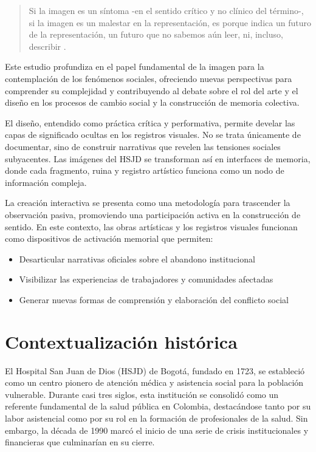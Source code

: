\begin{quote}
Si la imagen es un síntoma -en el sentido crítico y no clínico del término-, si la imagen es un malestar en la representación, es porque indica un futuro de la representación, un futuro que no sabemos aún leer, ni, incluso, describir \parencite[p. 177]{DidiHuberman2011}.
\end{quote}

Este estudio profundiza en el papel fundamental de la imagen para la contemplación de los fenómenos sociales, ofreciendo nuevas perspectivas para comprender su complejidad y contribuyendo al debate sobre el rol del arte y el diseño en los procesos de cambio social y la construcción de memoria colectiva.

El diseño, entendido como práctica crítica y performativa, permite develar las capas de significado ocultas en los registros visuales. No se trata únicamente de documentar, sino de construir narrativas que revelen las tensiones sociales subyacentes. Las imágenes del HSJD se transforman así en interfaces de memoria, donde cada fragmento, ruina y registro artístico funciona como un nodo de información compleja.

La creación interactiva se presenta como una metodología para trascender la observación pasiva, promoviendo una participación activa en la construcción de sentido. En este contexto, las obras artísticas y los registros visuales funcionan como dispositivos de activación memorial que permiten:

\begin{itemize}
    \item Desarticular narrativas oficiales sobre el abandono institucional
    \item Visibilizar las experiencias de trabajadores y comunidades afectadas
    \item Generar nuevas formas de comprensión y elaboración del conflicto social
\end{itemize}

\section*{Contextualización histórica}

El Hospital San Juan de Dios (HSJD) de Bogotá, fundado en 1723, se estableció como un centro pionero de atención médica y asistencia social para la población vulnerable. Durante casi tres siglos, esta institución se consolidó como un referente fundamental de la salud pública en Colombia, destacándose tanto por su labor asistencial como por su rol en la formación de profesionales de la salud. Sin embargo, la década de 1990 marcó el inicio de una serie de crisis institucionales y financieras que culminarían en su cierre.

